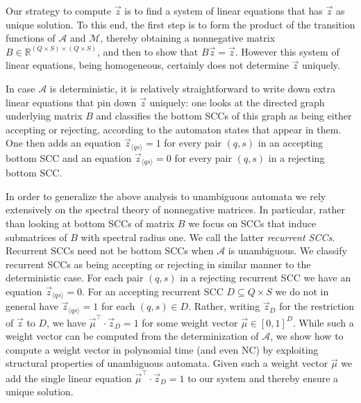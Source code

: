 \documentclass{elsarticle}
\def\<{\langle}
\def\>{\rangle}
\def\cA{\mathcal{A}}
\def\cM{\mathcal{M}}
\begin{document}
Our strategy to compute $\vec{z}$ is to find a system of linear
equations that has $\vec{z}$ as unique solution.  To this end, the
first step is to form the product of the transition functions of $\cA$
and $\cM$, thereby obtaining a nonnegative matrix
$B \in \mathbb{R}^{(Q\times S)\times (Q\times S)}$, and then to show that
  $B\vec{z}=\vec{z}$.  However this system of linear equations, being
  homogeneous, certainly does not determine $\vec{z}$ uniquely.

In case $\cA$ is deterministic, it is relatively straightforward to
write down extra linear equations that pin down $\vec{z}$ uniquely:
one looks at the directed graph underlying matrix $B$ and classifies
the bottom SCCs of this graph as being either accepting or rejecting,
according to the automaton states that appear in them.  One then adds
an equation $\vec{z}_{\<q s\>}=1$ for every pair $(q,s)$ in an accepting
  bottom SCC and an equation $\vec{z}_{\<q s\>}=0$ for every pair $(q,s)$
    in a rejecting bottom SCC.

In order to generalize the above analysis to unambiguous automata we
rely extensively on the spectral theory of nonnegative matrices.  In
particular, rather than looking at bottom SCCs of matrix $B$ we focus
on SCCs that induce submatrices of $B$ with spectral radius one.  We
call the latter \emph{recurrent SCCs}.  Recurrent SCCs need not be
bottom SCCs when $\cA$ is unambiguous. We classify recurrent SCCs as
being accepting or rejecting in similar manner to the deterministic
case.  For each pair $(q,s)$ in a rejecting recurrent SCC we have an
equation $\vec{z}_{\<qs\>}=0$.  For an accepting recurrent SCC
$D\subseteq Q\times S$ we do not in general have $\vec{z}_{\<qs\>}=1$
for each $(q,s) \in D$.  Rather, writing $\vec{z}_D$ for the
restriction of $\vec{z}$ to $D$, we have $\vec{\mu}^\top \cdot \vec{z}_D=1$
for some weight vector $\vec{\mu} \in [0,1]^D$.  While such a weight
vector can be computed from the determinization of $\cA$, we show how
to compute a weight vector in polynomial time (and even NC) by
exploiting structural properties of unambiguous automata.  Given such
a weight vector $\vec{\mu}$ we add the single linear equation
$\vec{\mu}^\top \cdot \vec{z}_D=1$ to our system and thereby ensure a
unique	solution.
\end{document}
